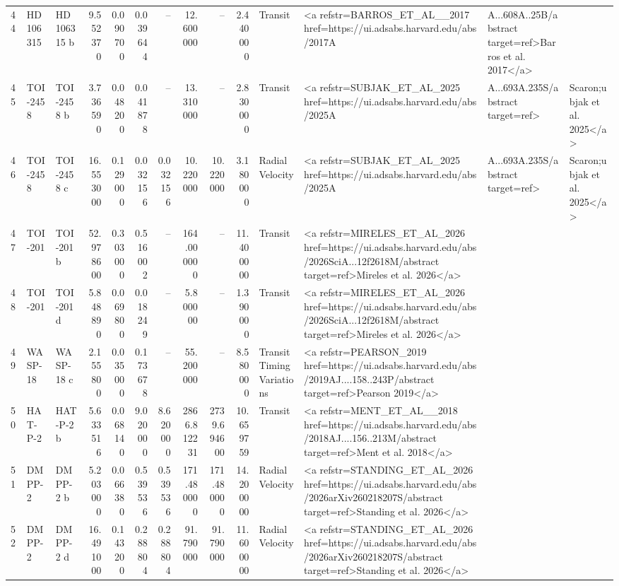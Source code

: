 \begin{tabular}{lllrrrrrrrll}
44 & HD 106315 & HD 106315 b & 9.552370 & 0.090700 & 0.039644 & -- & 12.600000 & -- & 2.440000 & Transit & <a refstr=BARROS_ET_AL__2017 href=https://ui.adsabs.harvard.edu/abs/2017A&A...608A..25B/abstract target=ref>Barros et al. 2017</a> \\
45 & TOI-2458 & TOI-2458 b & 3.736590 & 0.048200 & 0.041878 & -- & 13.310000 & -- & 2.830000 & Transit & <a refstr=SUBJAK_ET_AL_2025 href=https://ui.adsabs.harvard.edu/abs/2025A&A...693A.235S/abstract target=ref>&Scaron;ubjak et al. 2025</a> \\
46 & TOI-2458 & TOI-2458 c & 16.553000 & 0.129000 & 0.032156 & 0.032156 & 10.220000 & 10.220000 & 3.180000 & Radial Velocity & <a refstr=SUBJAK_ET_AL_2025 href=https://ui.adsabs.harvard.edu/abs/2025A&A...693A.235S/abstract target=ref>&Scaron;ubjak et al. 2025</a> \\
47 & TOI-201 & TOI-201 b & 52.978600 & 0.303000 & 0.516002 & -- & 164.000000 & -- & 11.400000 & Transit & <a refstr=MIRELES_ET_AL_2026 href=https://ui.adsabs.harvard.edu/abs/2026SciA...12f2618M/abstract target=ref>Mireles et al. 2026</a> \\
48 & TOI-201 & TOI-201 d & 5.848890 & 0.069800 & 0.018249 & -- & 5.800000 & -- & 1.390000 & Transit & <a refstr=MIRELES_ET_AL_2026 href=https://ui.adsabs.harvard.edu/abs/2026SciA...12f2618M/abstract target=ref>Mireles et al. 2026</a> \\
49 & WASP-18 & WASP-18 c & 2.155800 & 0.035000 & 0.173678 & -- & 55.200000 & -- & 8.580000 & Transit Timing Variations & <a refstr=PEARSON_2019 href=https://ui.adsabs.harvard.edu/abs/2019AJ....158..243P/abstract target=ref>Pearson 2019</a> \\
50 & HAT-P-2 & HAT-P-2 b & 5.633516 & 0.068140 & 9.020000 & 8.620000 & 2866.812231 & 2739.694600 & 10.659759 & Transit & <a refstr=MENT_ET_AL__2018 href=https://ui.adsabs.harvard.edu/abs/2018AJ....156..213M/abstract target=ref>Ment et al. 2018</a> \\
51 & DMPP-2 & DMPP-2 b & 5.203000 & 0.066380 & 0.539536 & 0.539536 & 171.480000 & 171.480000 & 14.200000 & Radial Velocity & <a refstr=STANDING_ET_AL_2026 href=https://ui.adsabs.harvard.edu/abs/2026arXiv260218207S/abstract target=ref>Standing et al. 2026</a> \\
52 & DMPP-2 & DMPP-2 d & 16.491000 & 0.143200 & 0.288804 & 0.288804 & 91.790000 & 91.790000 & 11.600000 & Radial Velocity & <a refstr=STANDING_ET_AL_2026 href=https://ui.adsabs.harvard.edu/abs/2026arXiv260218207S/abstract target=ref>Standing et al. 2026</a> \\

\end{tabular}
